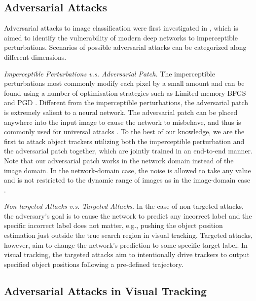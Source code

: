 \documentclass{article}
\newcommand{\eg}{e.g.}
\begin{document}
\subsection{Adversarial Attacks}

Adversarial attacks to image classification were first investigated in \cite{intriguing}, which is aimed to identify the vulnerability of modern deep networks to imperceptible perturbations. 
Scenarios of possible adversarial attacks can be categorized along different dimensions.

\textit{Imperceptible Perturbations v.s. Adversarial Patch.} The imperceptible perturbations most commonly modify each pixel by a small amount and can be found using a number of optimisation strategies such as Limited-memory BFGS \cite{intriguing} and PGD \cite{PGD}.
Different from the imperceptible perturbations, the adversarial patch is extremely salient to a neural network. The adversarial patch can be placed anywhere into the input image to cause the network to misbehave, and thus is commonly used for universal attacks \cite{patch}.
To the best of our knowledge, we are the first to attack object trackers utilizing both the imperceptible perturbation and the adversarial patch together, which are jointly trained in an end-to-end manner.
Note that our adversarial patch works in the network domain instead of the image domain. In the network-domain case, the noise is allowed to take any value and is not restricted to the dynamic range of images as in the image-domain case \cite{karmon2018lavan}.

\textit{Non-targeted Attacks v.s. Targeted Attacks.} In the case of non-targeted attacks, the adversary's goal is to cause the network to predict any incorrect label and the specific incorrect label does not matter, \eg, pushing the object position estimation just outside the true search region in visual tracking.
Targeted attacks, however, aim to change the network's prediction to some specific target label. In visual tracking, the targeted attacks aim to intentionally drive trackers to output specified object positions following a pre-defined trajectory.

\subsection{Adversarial Attacks in Visual Tracking}
\end{document}
